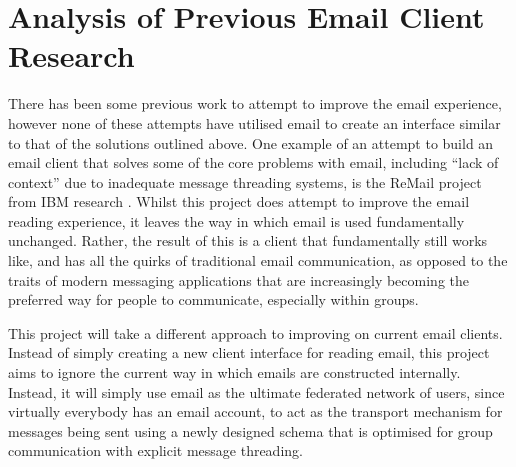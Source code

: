 \section{Analysis of Previous Email Client Research}

There has been some previous work to attempt to improve the email experience, however none of these attempts have utilised email to create an interface similar to that of the solutions outlined above. One example of an attempt to build an email client that solves some of the core problems with email, including ``lack of context'' due to inadequate message threading systems, is the ReMail project from IBM research \cite{kerr2004designing}. Whilst this project does attempt to improve the email reading experience, it leaves the way in which email is used fundamentally unchanged. Rather, the result of this is a client that fundamentally still works like, and has all the quirks of traditional email communication, as opposed to the traits of modern messaging applications that are increasingly becoming the preferred way for people to communicate, especially within groups.

This project will take a different approach to improving on current email clients. Instead of simply creating a new client interface for reading email, this project aims to ignore the current way in which emails are constructed internally. Instead, it will simply use email as the ultimate federated network of users, since virtually everybody has an email account, to act as the transport mechanism for messages being sent using a newly designed schema that is optimised for group communication with explicit message threading.
